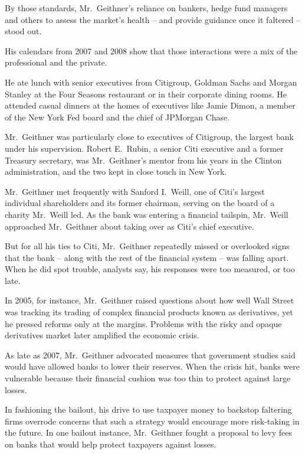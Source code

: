 \documentclass[12pt,a4paper,onecolumn]{article}
\begin{document}
By those standards, Mr.~Geithner's reliance on bankers, hedge fund managers and others to assess the
market's health -- and provide guidance once it faltered -- stood out.

His calendars from 2007 and 2008 show that those interactions were a mix of the professional and the
private.

He ate lunch with senior executives from Citigroup, Goldman Sachs and Morgan Stanley at the Four
Seasons restaurant or in their corporate dining rooms. He attended casual dinners at the homes of
executives like Jamie Dimon, a member of the New York Fed board and the chief of JPMorgan Chase.

Mr.~Geithner was particularly close to executives of Citigroup, the largest bank under his
supervision. Robert E.~Rubin, a senior Citi executive and a former Treasury secretary, was
Mr.~Geithner's mentor from his years in the Clinton administration, and the two kept in close touch
in New York.

Mr.~Geithner met frequently with Sanford I.~Weill, one of Citi's largest individual shareholders and
its former chairman, serving on the board of a charity Mr.~Weill led. As the bank was entering a
financial tailspin, Mr.~Weill approached Mr.~Geithner about taking over as Citi's chief executive.

But for all his ties to Citi, Mr.~Geithner repeatedly missed or overlooked signs that the bank --
along with the rest of the financial system -- was falling apart. When he did spot trouble, analysts
say, his responses were too measured, or too late.

In 2005, for instance, Mr.~Geithner raised questions about how well Wall Street was tracking its
trading of complex financial products known as derivatives, yet he pressed reforms only at the
margins. Problems with the risky and opaque derivatives market later amplified the economic crisis.

As late as 2007, Mr.~Geithner advocated measures that government studies said would have allowed
banks to lower their reserves. When the crisis hit, banks were vulnerable because their financial
cushion was too thin to protect against large losses.

In fashioning the bailout, his drive to use taxpayer money to backstop faltering firms overrode
concerns that such a strategy would encourage more risk-taking in the future. In one bailout
instance, Mr.~Geithner fought a proposal to levy fees on banks that would help protect taxpayers
against losses.
\end{document}
